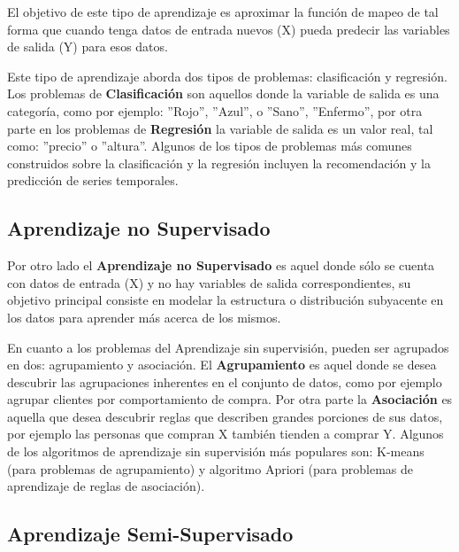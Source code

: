 El objetivo de este tipo de aprendizaje es aproximar la funci\'{o}n de mapeo de tal forma que cuando tenga datos de entrada nuevos (X) pueda predecir las variables de salida (Y) para esos datos. 

\vspace{5mm} %

Este tipo de aprendizaje aborda dos tipos de problemas: clasificaci\'{o}n y regresi\'{o}n. Los problemas de \textbf{Clasificaci\'{o}n} son aquellos donde la variable de salida es una categor\'{i}a, como por ejemplo: ''Rojo'', ''Azul'', o ''Sano'', ''Enfermo'', por otra parte en los problemas de \textbf{Regresi\'{o}n} la variable de salida es un valor real, tal como: ''precio'' o ''altura''. Algunos de los tipos de problemas m\'{a}s comunes construidos sobre la clasificaci\'{o}n y la regresi\'{o}n incluyen la recomendaci\'{o}n y la predicci\'{o}n de series temporales.

\subsection{Aprendizaje no Supervisado}

Por otro lado el \textbf{Aprendizaje no Supervisado} es aquel donde s\'{o}lo se cuenta con datos de entrada (X) y no hay variables de salida correspondientes, su objetivo principal consiste en modelar la estructura o distribuci\'{o}n subyacente en los datos para aprender m\'{a}s acerca de los mismos.

\vspace{5mm} %

En cuanto a los problemas del Aprendizaje sin supervisi\'{o}n, pueden ser agrupados en dos: agrupamiento y asociaci\'{o}n. El \textbf{Agrupamiento} es aquel donde se desea descubrir las agrupaciones inherentes en el conjunto de datos, como por ejemplo agrupar clientes por comportamiento de compra. Por otra parte la \textbf{Asociaci\'{o}n} es aquella que desea descubrir reglas que describen grandes porciones de sus datos, por ejemplo las personas que compran X tambi\'{e}n tienden a comprar Y. Algunos de los algoritmos de aprendizaje sin supervisi\'{o}n m\'{a}s populares son: K-means (para problemas de agrupamiento) y algoritmo Apriori (para problemas de aprendizaje de reglas de asociaci\'{o}n).

\subsection{Aprendizaje Semi-Supervisado}

